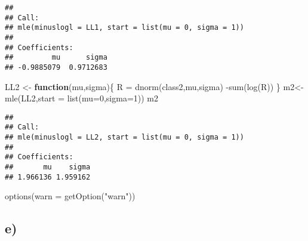 \documentclass[
]{article}
\newenvironment{Shaded}{\begin{snugshade}}{\end{snugshade}}
\newcommand{\AttributeTok}[1]{\textcolor[rgb]{0.77,0.63,0.00}{#1}}
\newcommand{\ControlFlowTok}[1]{\textcolor[rgb]{0.13,0.29,0.53}{\textbf{#1}}}
\newcommand{\DecValTok}[1]{\textcolor[rgb]{0.00,0.00,0.81}{#1}}
\newcommand{\FunctionTok}[1]{\textcolor[rgb]{0.00,0.00,0.00}{#1}}
\newcommand{\NormalTok}[1]{#1}
\newcommand{\OtherTok}[1]{\textcolor[rgb]{0.56,0.35,0.01}{#1}}
\newcommand{\SpecialCharTok}[1]{\textcolor[rgb]{0.00,0.00,0.00}{#1}}
\newcommand{\StringTok}[1]{\textcolor[rgb]{0.31,0.60,0.02}{#1}}
\begin{document}
\begin{verbatim}
## 
## Call:
## mle(minuslogl = LL1, start = list(mu = 0, sigma = 1))
## 
## Coefficients:
##         mu      sigma 
## -0.9885079  0.9712683
\end{verbatim}

\begin{Shaded}
\begin{Highlighting}[]
\NormalTok{LL2 }\OtherTok{\textless{}{-}} \ControlFlowTok{function}\NormalTok{(mu,sigma)\{}
\NormalTok{  R }\OtherTok{=} \FunctionTok{dnorm}\NormalTok{(class2,mu,sigma)}
  \SpecialCharTok{{-}}\FunctionTok{sum}\NormalTok{(}\FunctionTok{log}\NormalTok{(R))}
\NormalTok{\}}
\NormalTok{m2}\OtherTok{\textless{}{-}}\FunctionTok{mle}\NormalTok{(LL2,}\AttributeTok{start =} \FunctionTok{list}\NormalTok{(}\AttributeTok{mu=}\DecValTok{0}\NormalTok{,}\AttributeTok{sigma=}\DecValTok{1}\NormalTok{))}
\NormalTok{m2}
\end{Highlighting}
\end{Shaded}

\begin{verbatim}
## 
## Call:
## mle(minuslogl = LL2, start = list(mu = 0, sigma = 1))
## 
## Coefficients:
##       mu    sigma 
## 1.966136 1.959162
\end{verbatim}

\begin{Shaded}
\begin{Highlighting}[]
\FunctionTok{options}\NormalTok{(}\AttributeTok{warn =} \FunctionTok{getOption}\NormalTok{(}\StringTok{"warn"}\NormalTok{))}
\end{Highlighting}
\end{Shaded}

\hypertarget{e-1}{%
\subsection{e)}\label{e-1}}
\end{document}
